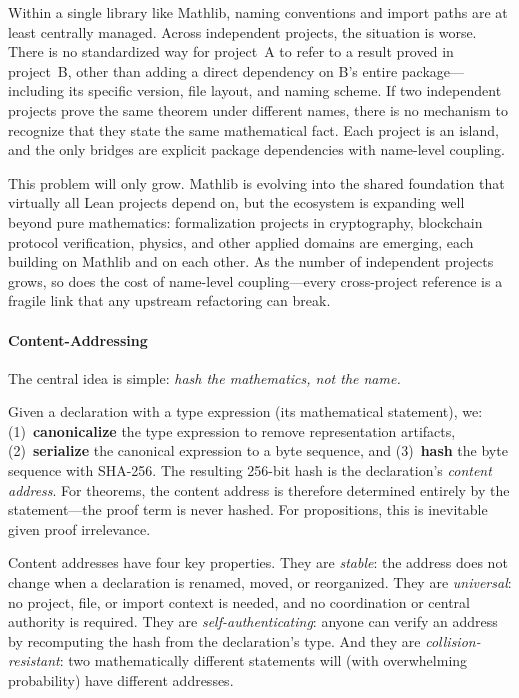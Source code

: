 Within a single library like Mathlib, naming conventions and import
paths are at least centrally managed.  Across independent projects, the
situation is worse.  There is no standardized way for project~A to
refer to a result proved in project~B, other than adding a direct
dependency on B's entire package---including its specific version, file
layout, and naming scheme.  If two independent projects prove the same
theorem under different names, there is no mechanism to recognize that
they state the same mathematical fact.  Each project is an island, and
the only bridges are explicit package dependencies with name-level
coupling.

This problem will only grow.  Mathlib is evolving into the shared
foundation that virtually all Lean projects depend on, but the
ecosystem is expanding well beyond pure mathematics: formalization
projects in cryptography, blockchain protocol verification, physics,
and other applied domains are emerging, each building on Mathlib and
on each other.  As the number of independent projects grows, so does
the cost of name-level coupling---every cross-project reference is a
fragile link that any upstream refactoring can break.


\paragraph{Content-Addressing}

The central idea is simple: \emph{hash the mathematics, not the name.}

Given a declaration with a type expression (its mathematical statement),
we: (1)~\textbf{canonicalize} the type expression to remove
representation artifacts, (2)~\textbf{serialize} the canonical
expression to a byte sequence, and (3)~\textbf{hash} the byte sequence
with SHA-256.  The resulting 256-bit hash is the declaration's
\emph{content address}.
For theorems, the content address is therefore determined entirely by
the statement---the proof term is never hashed.
For propositions, this is inevitable given proof irrelevance.

Content addresses have four key properties.  They are \emph{stable}:
the address does not change when a declaration is renamed, moved, or
reorganized.  They are \emph{universal}: no project, file, or import
context is needed, and no coordination or central authority is required.
They are \emph{self-authenticating}: anyone can verify an address by
recomputing the hash from the declaration's type.  And they are
\emph{collision-resistant}: two mathematically different statements will
(with overwhelming probability) have different addresses.

